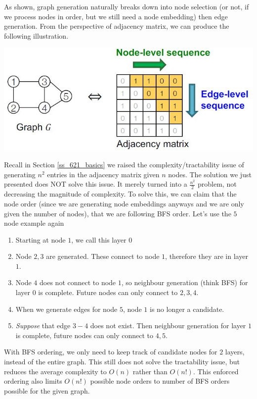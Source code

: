 As shown, graph generation naturally breaks down into node selection (or not, if we process nodes in order, but we still need a node embedding) then edge generation. From the perspective of adjacency matrix, we can produce the following illustration.

{
\centering
\includegraphics[width=0.85\linewidth]{notes/img/l10_p35_adj.JPG} \par
}

Recall in Section \ref{ss_621_basics} we raised the complexity/tractability issue of generating $n^2$ entries in the adjacency matrix given $n$ nodes. The solution we just presented does NOT solve this issue. It merely turned into a $\frac{n^2}{2}$ problem, not decreasing the magnitude of complexity. To solve this, we can claim that the node order (since we are generating node embeddings anyways and we are only given the number of nodes), that we are following BFS order. Let's use the $5$ node example again

\begin{enumerate}
    \item Starting at node $1$, we call this layer $0$
    
    \item Node $2, 3$ are generated. These connect to node $1$, therefore they are in layer $1$.
    
    \item Node $4$ does not connect to node $1$, so neighbour generation (think BFS) for layer $0$ is complete. Future nodes can only connect to $2, 3, 4$.
    
    \item When we generate edges for node $5$, node $1$ is no longer a candidate. 
    
    \item \textit{Suppose} that edge $3-4$ does not exist. Then neighbour generation for layer $1$ is complete, future nodes can only connect to $4, 5$.
\end{enumerate}{}

With BFS ordering, we only need to keep track of candidate nodes for $2$ layers, instead of the entire graph. This still does not solve the tractability issue, but reduces the average complexity to $O(n)$ rather than $O(n!)$. This enforced ordering also limits $O(n!)$ possible node orders to number of BFS orders possible for the given graph. 

